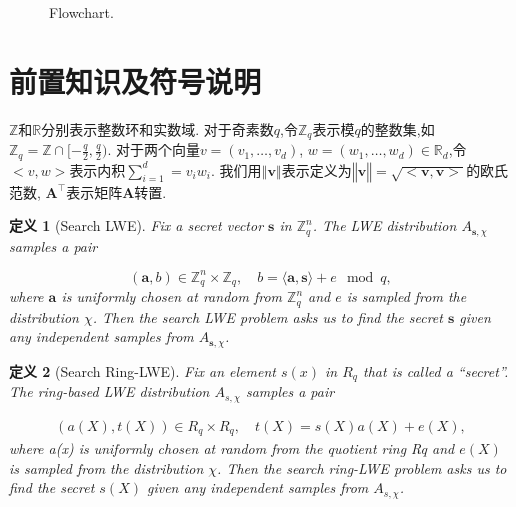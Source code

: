 \documentclass[12pt,a4paper]{article}
\newtheorem{definition}{定义} %
\numberwithin{equation}{section}
\begin{document}
\begin{figure}[htbp]
\begin{center}
\begin{tikzpicture}



\end{tikzpicture}
    
\end{center}
    \caption{Flowchart.}
    \label{fig:flowchart}
\end{figure}




\section{前置知识及符号说明}
$\mathbb{Z}$和$\mathbb{R}$分别表示整数环和实数域.
对于奇素数$q$,令$\mathbb{Z}_q$表示模$q$的整数集,如$\mathbb{Z}_q = \mathbb{Z}\cap[-\frac{q}{2},\frac{q}{2})$.
对于两个向量$v =(v_1 , \ldots , v_d)$, $w = ( w_1 , \ldots , w_d) \in \mathbb{R}_d$,令$<v,w>$表示内积$ \sum_{i=1}^{d}= v_iw_i$.
我们用$‖\mathbf{v}‖$表示定义为$‖\mathbf{v}‖=\sqrt{<\mathbf{v},\mathbf{v}>}$的欧氏范数, $\mathbf{A}^\top$表示矩阵$\mathbf{A}$转置.

\begin{definition}[Search LWE]
Fix a secret vector $\mathbf{s}$ in $\mathbb{Z}_q^n$.  
The LWE distribution $A_{\mathbf{s},\chi}$ samples a pair  

\[
(\mathbf{a}, b) \in \mathbb{Z}_q^n \times \mathbb{Z}_q, \quad b = \langle \mathbf{a}, \mathbf{s} \rangle + e \mod q,
\]  
where $\mathbf{a}$ is uniformly chosen at random from $\mathbb{Z}_q^n$ and $e$ is sampled from the distribution $\chi$. Then the search LWE problem asks us to find the secret $\mathbf{s}$ given any independent samples from $A_{\mathbf{s},\chi}$.  
\end{definition}

\begin{definition}[Search Ring-LWE]
Fix an element $s(x)$ in $R_q$ that is called a “secret”. 
The ring-based LWE distribution $A_{s,\chi}$ samples a pair

\begin{align}
    (a(X), t(X)) \in R_q \times R_q, \quad t(X) = s(X)a(X) + e(X),
\end{align}
where a(x) is uniformly chosen at random from the quotient ring Rq and $e(X)$ is sampled from the distribution $\chi$. Then the search ring-LWE problem asks us to find the secret $s(X)$ given any independent samples from $A_{s,\chi}$.
\end{definition}
\end{document}
